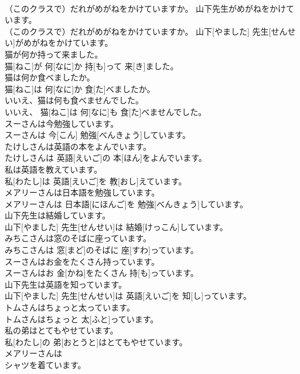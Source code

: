 \documentclass[8pt]{extreport}
\begin{document}
\begin{CJK}{UTF8}{min}
\\	（このクラスで）だれがめがねをかけていますか。 山下先生がめがねをかけています。	
\\	（このクラスで）だれがめがねをかけていますか。 山下[やました] 先生[せんせい]がめがねをかけています。	
\\	猫が何か持って来ました。	
\\	猫[ねこ]が 何[なに]か 持[も]って 来[き]ました。	
\\	猫は何か食べましたか。	
\\	猫[ねこ]は 何[なに]か 食[た]べましたか。	
\\	いいえ、猫は何も食べませんでした。	
\\	いいえ、 猫[ねこ]は 何[なに]も 食[た]べませんでした。	
\\	スーさんは今勉強しています。	
\\	スーさんは 今[こん] 勉強[べんきょう]しています。	
\\	たけしさんは英語の本をよんでいます。	
\\	たけしさんは 英語[えいご]の 本[ほん]をよんでいます。	
\\	私は英語を教えています。	
\\	私[わたし]は 英語[えいご]を 教[おし]えています。	
\\	メアリーさんは日本語を勉強しています。	
\\	メアリーさんは 日本語[にほんご]を 勉強[べんきょう]しています。	
\\	山下先生は結婚しています。	
\\	山下[やました] 先生[せんせい]は 結婚[けっこん]しています。	
\\	みちこさんは窓のそばに座っています。	
\\	みちこさんは 窓[まど]のそばに 座[すわ]っています。	
\\	スーさんはお金をたくさん持っています。	
\\	スーさんはお 金[かね]をたくさん 持[も]っています。	
\\	山下先生は英語を知っています。	
\\	山下[やました] 先生[せんせい]は 英語[えいご]を 知[し]っています。	
\\	トムさんはちょっと太っています。	
\\	トムさんはちょっと 太[ふと]っています。	
\\	私の弟はとてもやせています。	
\\	私[わたし]の 弟[おとうと]はとてもやせています。	
\\	メアリーさんは
\\	シャツを着ています。	

\end{CJK}
\end{document}
